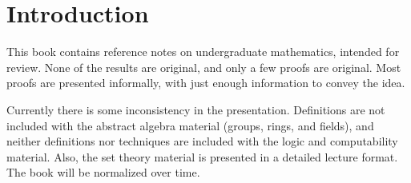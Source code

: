 %
%
%
\chapter*{Introduction}
This book contains reference notes on undergraduate mathematics, intended for review. None of the results are original, and only a few proofs are original. Most proofs are presented informally, with just enough information to convey the idea.

Currently there is some inconsistency in the presentation. Definitions are not included with the abstract algebra material (groups, rings, and fields), and neither definitions nor techniques are included with the logic and computability material. Also, the set theory material is presented in a detailed lecture format. The book will be normalized over time.
